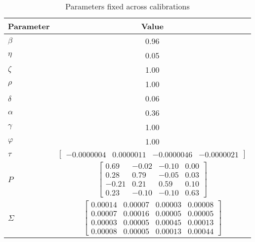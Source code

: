 \begin{table}[h!]
\renewcommand{\arraystretch}{1.2}
\begin{center}
\caption{Parameters fixed across calibrations}
\label{tab:cal1}
\begin{tabular}{lc}
\toprule
Parameter & Value\\
\midrule
$\beta$ & 0.96\\
$\eta$ & 0.05\\
$\zeta$ & 1.00\\
$\rho$ & 1.00\\
$\delta$ & 0.06\\
$\alpha$ & 0.36\\
$\gamma$ & 1.00\\
$\varphi$ & 1.00\\
$\tau$ & $\begin{bmatrix}-0.0000004 &0.0000011 &-0.0000046 &-0.0000021\end{bmatrix}$\\[2ex]
$P$ & $\begin{bmatrix}0.69&-0.02&-0.10&0.00\\0.28&0.79&-0.05&0.03\\-0.21&0.21&0.59&0.10\\0.23&-0.10&-0.10&0.63\end{bmatrix}$\\[6ex]
$\Sigma$ & $\begin{bmatrix}0.00014&0.00007&0.00003&0.00008\\0.00007&0.00016&0.00005&0.00005\\0.00003&0.00005&0.00045&0.00013\\0.00008&0.00005&0.00013&0.00044\end{bmatrix}$\\[6ex]
\bottomrule
\end{tabular}
\end{center}
\end{table}
